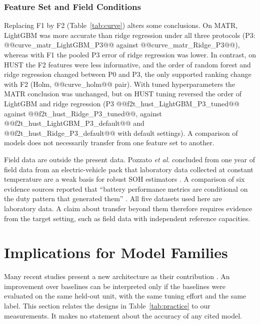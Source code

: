 \documentclass{ieeeaccess}
\newcommand{\fitcol}[1]{\footnotesize\resizebox{\ifdim\width>\columnwidth\columnwidth\else\width\fi}{!}{}}
\begin{document}
\subsubsection{Feature Set and Field Conditions}
\label{sec:res_curve}
\label{sec:res_field}
Replacing F1 by F2 (Table~\ref{tab:curve}) alters some conclusions. On MATR, LightGBM was more accurate than ridge regression under all three protocols (P3: @@curve_matr_LightGBM_P3@@ against @@curve_matr_Ridge_P3@@), whereas with F1 the pooled P3 error of ridge regression was lower. In contrast, on HUST the F2 features were less informative, and the order of random forest and ridge regression changed between P0 and P3, the only supported ranking change with F2 (Holm, @@curve_holm@@ pair). With tuned hyperparameters the MATR conclusion was unchanged, but on HUST tuning reversed the order of LightGBM and ridge regression (P3 @@f2t_hust_LightGBM_P3_tuned@@ against @@f2t_hust_Ridge_P3_tuned@@, against @@f2t_hust_LightGBM_P3_default@@ and @@f2t_hust_Ridge_P3_default@@ with default settings). A comparison of models does not necessarily transfer from one feature set to another.
\begin{table}[!tb]
\centering
\caption{Pooled RMSE (\% SOH) with charge-curve features F2, fixed hyperparameters.}
\label{tab:curve}
\scriptsize
\fitcol{tables/curve.tex}
\end{table}

Field data are outside the present data. Pozzato \textit{et al.} concluded from one year of field data from an electric-vehicle pack that laboratory data collected at constant temperature are a weak basis for robust SOH estimators \cite{pozzato2023}. A comparison of six evidence sources reported that ``battery performance metrics are conditional on the duty pattern that generated them'' \cite{zhao2026}. All five datasets used here are laboratory data. A claim about transfer beyond them therefore requires evidence from the target setting, such as field data with independent reference capacities.

\section{Implications for Model Families}
\label{sec:families}
Many recent studies present a new architecture as their contribution \cite{aud24,aud26,aud25}. An improvement over baselines can be interpreted only if the baselines were evaluated on the same held-out unit, with the same tuning effort and the same label. This section relates the designs in Table~\ref{tab:practice} to our measurements. It makes no statement about the accuracy of any cited model.
\end{document}
